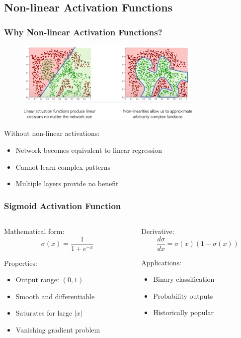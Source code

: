 \documentclass{beamer}
\begin{document}
\subsection{Non-linear Activation Functions}
\begin{frame}
\frametitle{Why Non-linear Activation Functions?}
\begin{figure}
\includegraphics[width=0.8\textwidth]{why-activation.png}
\end{figure}

Without non-linear activations:
\begin{itemize}
    \item Network becomes equivalent to linear regression
    \item Cannot learn complex patterns
    \item Multiple layers provide no benefit
\end{itemize}
\end{frame}

\begin{frame}
\frametitle{Sigmoid Activation Function}
\begin{columns}
\begin{column}{0.5\textwidth}
Mathematical form:
\begin{equation}
\sigma(x) = \frac{1}{1 + e^{-x}}
\end{equation}

Properties:
\begin{itemize}
    \item Output range: $(0, 1)$
    \item Smooth and differentiable
    \item Saturates for large $|x|$
    \item Vanishing gradient problem
\end{itemize}
\end{column}
\begin{column}{0.5\textwidth}
Derivative:
\begin{equation}
\frac{d\sigma}{dx} = \sigma(x)(1 - \sigma(x))
\end{equation}

Applications:
\begin{itemize}
    \item Binary classification
    \item Probability outputs
    \item Historically popular
\end{itemize}
\end{column}
\end{columns}
\end{frame}
\end{document}
